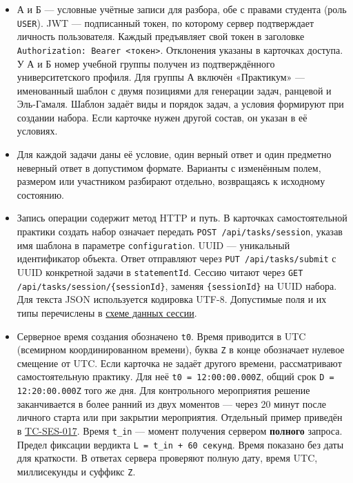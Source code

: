 \documentclass[12pt,a4paper]{article}
\newcommand{\tightlist}{\setlength{\itemsep}{0pt}\setlength{\parskip}{0pt}}
\begin{document}
\hypertarget{общие-исходные-данные}{}

\begin{itemize}
\tightlist
\item
  А и Б --- условные учётные записи для разбора, обе с правами студента (роль \texttt{USER}). JWT --- подписанный токен, по которому сервер подтверждает личность пользователя. Каждый предъявляет свой токен в заголовке \texttt{Authorization:\ Bearer\ \textless{}токен\textgreater{}}. Отклонения указаны в карточках доступа. У А и Б номер учебной группы получен из подтверждённого университетского профиля. Для группы А включён «Практикум» --- именованный шаблон с двумя позициями для генерации задач, ранцевой и Эль-Гамаля. Шаблон задаёт виды и порядок задач, а условия формируют при создании набора. Если карточке нужен другой состав, он указан в её условиях.
\item
  Для каждой задачи даны её условие, один верный ответ и один предметно неверный ответ в допустимом формате. Варианты с изменённым полем, размером или участником разбирают отдельно, возвращаясь к исходному состоянию.
\item
  Запись операции содержит метод HTTP и путь. В карточках самостоятельной практики создать набор означает передать \texttt{POST /\allowbreak{}api/\allowbreak{}tasks/\allowbreak{}session}, указав имя шаблона в параметре \texttt{configuration}. UUID --- уникальный идентификатор объекта. Ответ отправляют через \texttt{PUT /\allowbreak{}api/\allowbreak{}tasks/\allowbreak{}submit} с UUID конкретной задачи в \texttt{statement\allowbreak{}Id}. Сессию читают через \texttt{GET /\allowbreak{}api/\allowbreak{}tasks/\allowbreak{}session/\allowbreak{}\{session\allowbreak{}Id\}}, заменяя \texttt{\{session\allowbreak{}Id\}} на UUID набора. Для текста JSON используется кодировка UTF-8. Допустимые поля и их типы перечислены в {\href{../07\_Программные\_требования/DOC-06.2\_Сессии\_задач\_и\_планировщик.pdf\#представление-сессии-и-задачи}{схеме данных сессии}}.
\item
  Серверное время создания обозначено \texttt{t0}. Время приводится в UTC (всемирном координированном времени), буква \texttt{Z} в конце обозначает нулевое смещение от UTC. Если карточка не задаёт другого времени, рассматривают самостоятельную практику. Для неё \texttt{t0 =\allowbreak{} 12:00:00.\allowbreak{}000Z}, общий срок \texttt{D =\allowbreak{} 12:20:00.\allowbreak{}000Z} того же дня. Для контрольного мероприятия решение заканчивается в более ранний из двух моментов --- через 20 минут после личного старта или при закрытии мероприятия. Отдельный пример приведён в {\hyperlink{tc-ses-017}{TC-SES-017}}. Время \texttt{t\_in} --- момент получения сервером \textbf{полного} запроса. Предел фиксации вердикта \texttt{L =\allowbreak{} t\_\allowbreak{}in + 60 секунд}. Время показано без даты для краткости. В ответах сервера проверяют полную дату, время UTC, миллисекунды и суффикс \texttt{Z}.

\end{itemize}
\end{document}
